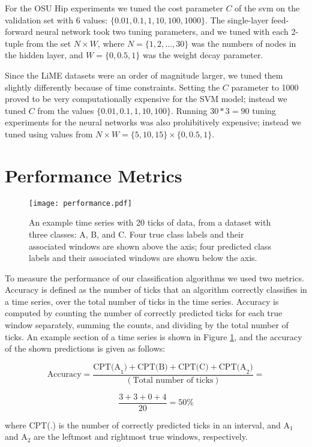 For the OSU Hip experiments we tuned the
cost parameter $C$ of the svm on the validation set with 6 values:
$\{0.01,0.1,1,10,100,1000\}$. The single-layer feed-forward neural network took
two tuning parameters, and we tuned with each 2-tuple from the set $N \times W$,
where $N = \{1,2, \ldots, 30\}$ was the numbers of nodes in the hidden layer, and 
$W = \{0,0.5,1\}$ was the weight decay parameter.

Since the LiME datasets were an order of magnitude larger, we tuned them
slightly differently because of time constraints. Setting the $C$ parameter to
1000 proved to be very computationally expensive for the SVM model; instead we tuned $C$
from the values $\{0.01,0.1,1,10,100\}$. Running $30*3=90$ tuning experiments
for the neural networks was also prohibitively expensive; instead we tuned using
values from $N \times W = \{5,10,15\} \times \{0,0.5,1\}$.




\section{Performance Metrics}
\begin{figure}[h]
 \centering
 \texttt{[image: performance.pdf]}
 \caption{An example time series with 20 ticks of data, from a dataset with
  three classes: A, B, and C. Four true class labels and their associated
  windows are shown above the axis; four predicted class
  labels and their associated windows are shown below the axis.}
 \label{fig:performance}
\end{figure}

To measure the performance of our classification algorithms we used
two metrics. Accuracy is defined as the number of ticks that an algorithm
correctly classifies in a time series, over the total number of ticks
in the time series. Accuracy is computed by counting the number of
correctly predicted ticks for each true window separately, summing the counts,
and dividing by the total number of ticks. An example section of a time series
is shown in Figure \ref{fig:performance}, and the accuracy of the shown
predictions is given as follows:

\[
\text{Accuracy} = \frac{\text{CPT(A}_1) + \text{CPT(B)} + \text{CPT(C)} + \text{CPT(A}_2)}{(\text{Total number of ticks})} =
\]

\[
\frac{3 + 3 + 0 + 4}{20} = 50\%
\]

where CPT(.) is the number of correctly predicted ticks in an interval, and
A$_1$ and A$_2$ are the leftmost and rightmost true windows, respectively.

